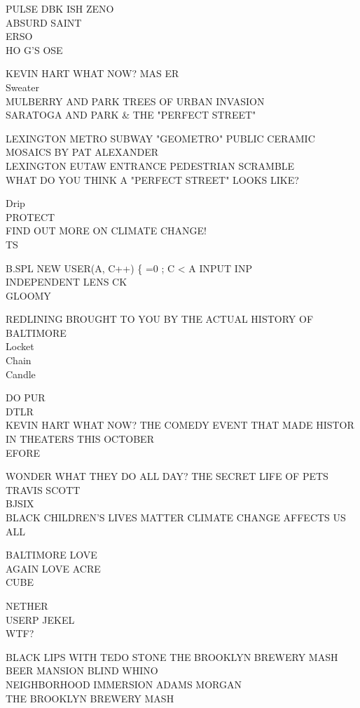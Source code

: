 \documentclass[10pt,letterpaper]{article}
\begin{document}
PULSE DBK ISH ZENO\\
ABSURD SAINT\\
ERSO\\
HO G'S OSE

KEVIN HART WHAT NOW?  MAS ER\\
Sweater\\
MULBERRY AND PARK TREES OF URBAN INVASION\\
SARATOGA AND PARK \& THE "PERFECT STREET"

LEXINGTON METRO SUBWAY "GEOMETRO" PUBLIC CERAMIC MOSAICS BY PAT ALEXANDER\\
LEXINGTON EUTAW ENTRANCE PEDESTRIAN SCRAMBLE\\
WHAT DO YOU THINK A "PERFECT STREET" LOOKS LIKE?

Drip\\
PROTECT\\
FIND OUT MORE ON CLIMATE CHANGE!\\
TS

B.SPL NEW USER(A,  C++)  \{   =0 ; C < A INPUT INP\\
INDEPENDENT LENS CK\\
GLOOMY

REDLINING BROUGHT TO YOU BY THE ACTUAL HISTORY OF BALTIMORE\\
Locket\\
Chain\\
Candle

DO PUR\\
DTLR\\
KEVIN HART WHAT NOW?  THE COMEDY EVENT THAT MADE HISTOR IN THEATERS THIS OCTOBER\\
EFORE

WONDER WHAT THEY DO ALL DAY?  THE SECRET LIFE OF PETS\\
TRAVIS SCOTT\\
BJSIX\\
BLACK CHILDREN'S LIVES MATTER CLIMATE CHANGE AFFECTS US ALL

BALTIMORE LOVE\\
AGAIN LOVE ACRE\\
CUBE

NETHER\\
USERP JEKEL\\
WTF?

BLACK LIPS WITH TEDO STONE THE BROOKLYN BREWERY MASH\\
BEER MANSION BLIND WHINO\\
NEIGHBORHOOD IMMERSION ADAMS MORGAN\\
THE BROOKLYN BREWERY MASH
\end{document}
